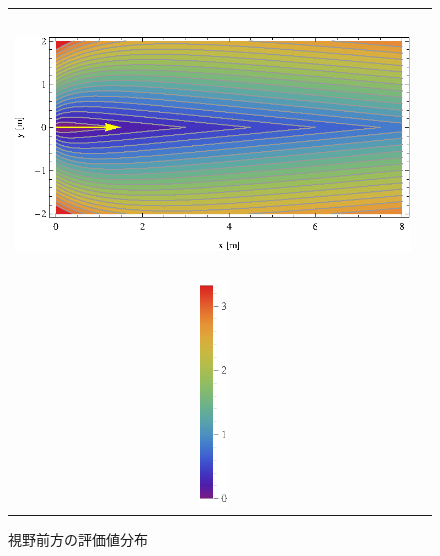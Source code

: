 \begin{figure}[htbp]
\begin{tabular}{cc}
%
  \begin{minipage}{0.8\textwidth}
    \begin{center}
      \includegraphics[height=70mm]{figure/sort_key.eps}
    \end{center}
  \end{minipage}
%
  \begin{minipage}{0.1\textwidth}
    \begin{center}
      \includegraphics[height=60mm]{figure/sort_key_legends.eps}
    \end{center}
    \vspace{3mm}
  \end{minipage}
%
\end{tabular}
\caption{視野前方の評価値分布}
\label{fig:sort_key}
\end{figure}


